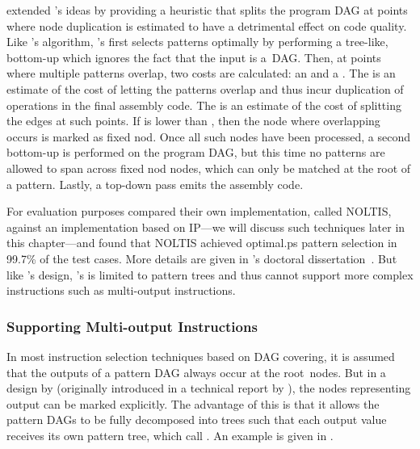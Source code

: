 \textcite{Koes2008} extended \citeauthor{Ertl1999}'s ideas by providing a
heuristic that splits the \gls{program DAG} at points where \gls{node
  duplication} is estimated to have a detrimental effect on code quality.
%
Like
\citeauthor{Ertl1999}'s algorithm, \citeauthor{Koes2008}'s first selects
\glspl{pattern} optimally by performing a \gls{tree}-like, bottom-up \tDPpass
which ignores the fact that the input is a~\gls{DAG}.
%
Then, at points where
multiple \glspl{pattern} overlap, two costs are calculated: an
\emph{\overlapCost} and a \emph{\cseCost}.
%
The \overlapCost is an estimate of
the cost of letting the \glspl{pattern} overlap and thus incur duplication of
operations in the final \gls{assembly code}.
%
The \cseCost is an estimate of the
cost of splitting the \glspl{edge} at such points.
%
If \cseCost is lower than
\overlapCost, then the \gls{node} where overlapping occurs is marked as
\gls{fixed nod}.
%
Once all such \glspl{node} have been processed, a second
bottom-up \tDPpass is performed on the \gls{program DAG}, but this time no
\glspl{pattern} are allowed to span across \gls{fixed nod} \glspl{node}, which
can only be matched at the \gls{root} of a \gls{pattern}.
%
Lastly, a top-down
pass emits the \gls{assembly code}.

For evaluation purposes \citeauthor{Koes2008} compared their own implementation,
called \gls{NOLTIS}, against an implementation based on \glsdesc{IP}---we will
discuss such techniques later in this chapter---and found that \gls{NOLTIS}
achieved \gls{optimal.ps} \gls{pattern selection} in 99.7\% of the test
cases.
%
More details are given in \citeauthor{Koes2009}'s doctoral
dissertation~\cite{Koes2009}.
%
But like \citeauthor{Ertl1999}'s design,
\citeauthor{Koes2008}'s is limited to \glspl{pattern tree} and thus cannot
support more complex \glspl{instruction} such as \glspl{multi-output
  instruction}.


\subsubsection{Supporting Multi-output Instructions}

In most \gls{instruction selection} techniques based on \gls{DAG covering}, it
is assumed that the outputs of a \gls{pattern DAG} always occur at the
\gls{root}~\glspl{node}.
%
But in a design by  (originally introduced in a technical report by
\textcite{Arnold1999a}), the \glspl{node} representing output can be marked
explicitly.
%
The advantage of this is that it allows the \glspl{pattern DAG} to
be fully decomposed into \glspl{tree} such that each output value receives its
own \gls{pattern tree}, which \citeauthor{Arnold1999b} call
\tpartialPatterns.
%
An example is given in .

